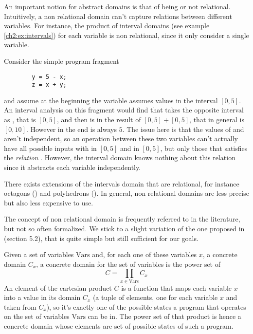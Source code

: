 An important notion for abstract domains is that of being or not relational. Intuitively, a non relational domain can't capture relations between different variables. For instance, the product of interval domains (see example \ref{ch2:ex:intervals}) for each variable is non relational, since it only consider a single variable.
\begin{example}
	Consider the simple program fragment
	\begin{verbatim}
		y = 5 - x;
		z = x + y;
	\end{verbatim}
	and assume at the beginning the variable  assumes values in the interval $[0, 5]$. An interval analysis on this fragment would find that  takes the opposite interval as , that is $[0, 5]$, and then  is in the result of $[0, 5] + [0, 5]$, that in general is $[0, 10]$. However in the end  is always $5$.
	The issue here is that the values of  and  aren't independent, so an operation between these two variables can't actually have all possible inputs with  in $[0, 5]$ and  in $[0, 5]$, but only those that satisfies the \textit{relation} . However, the interval domain knows nothing about this relation since it abstracts each variable independently.
\end{example}
There exists extensions of the intervals domain that are relational, for instance octagons (\cite{mine-octagons}) and polyhedrons (\cite{cousot-polyhedrons}). In general, non relational domains are less precise but also less expensive to use.

The concept of non relational domain is frequently referred to in the literature, but not so often formalized. We stick to a slight variation of the one proposed in \cite{giacobazzi-analyzing-analyses} (section 5.2), that is quite simple but still sufficient for our goals.

Given a set of variables $\text{Vars}$ and, for each one of these variables $x$, a concrete domain $C_x$, a concrete domain for the set of variables is the power set of
\[
C = \prod\limits_{x \in \text{Vars}} C_x
\]
An element of the cartesian product $C$ is a function that maps each variable $x$ into a value in its domain $C_x$ (a tuple of elements, one for each variable $x$ and taken from $C_x$), so it's exactly one of the possible states a program that operates on the set of variables $\text{Vars}$ can be in. The power set of that product is hence a concrete domain whose elements are set of possible states of such a program.

